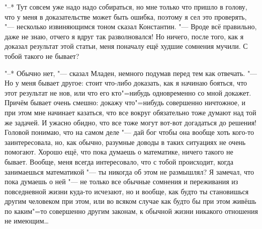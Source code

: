 "--* Тут совсем уже надо надо собираться, но мне только что пришло в голову, что
у меня в доказательстве может быть ошибка, поэтому я сел это проверять, "---
несколько извиняющимся тоном сказал Константин.
"--- Вроде всё правильно, даже не знаю, отчего я вдруг так разволновался!
Но ничего, после того, как я доказал результат этой статьи, меня поначалу ещё
худшие сомнения мучили.
С тобой такого не бывает?

"--* Обычно нет, "--- сказал Младен, немного подумав перед тем как отвечать.
"--- Но у меня бывает другое: стоит что-либо доказать, как я начинаю бояться,
что этот результат не нов, или что его кто"=нибудь одновременно со мной докажет.
Причём бывает очень смешно: докажу что"=нибудь совершенно ничтожное, и при этом
мне начинает казаться, что все вокруг обязательно тоже думают над той же задачей.
И ужасно обидно, что все тоже могут вот-вот догадаться до решения!
Головой понимаю, что на самом деле "--- дай бог чтобы она вообще хоть кого-то
заинтересовала, но, как обычно, разумные доводы в таких ситуациях не очень
помогают.
Хорошо ещё, что пока думаешь о математике, ничего такого не бывает.
Вообще, меня всегда интересовало, что с тобой происходит, когда занимаешься
математикой "--- ты никогда об этом не размышлял?
Я замечал, что пока думаешь о ней "--- не только все обычные сомнения и
переживания из повседневной жизни куда-то исчезают, но и вообще, как будто ты
становишься другим человеком при этом, или во всяком случае как будто бы при
этом живёшь по каким"=то совершенно другим законам, к обычной жизни никакого
отношения не имеющим\ldots

